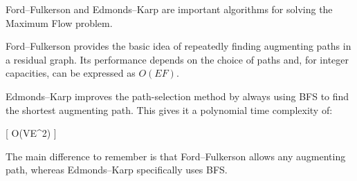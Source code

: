 \documentclass[12pt,a4paper]{article}
\begin{document}
Ford--Fulkerson and Edmonds--Karp are important algorithms for solving
the Maximum Flow problem.

Ford--Fulkerson provides the basic idea of repeatedly finding
augmenting paths in a residual graph. Its performance depends on the
choice of paths and, for integer capacities, can be expressed as
$O(EF)$.

Edmonds--Karp improves the path-selection method by always using BFS to
find the shortest augmenting path. This gives it a polynomial
time complexity of:

[
O(VE^2)
]

The main difference to remember is that Ford--Fulkerson allows any
augmenting path, whereas Edmonds--Karp specifically uses BFS.
\end{document}
